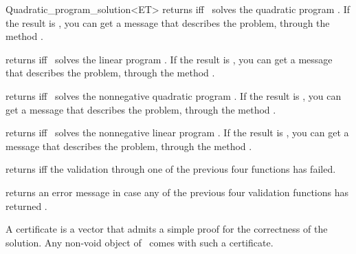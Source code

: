 \begin{ccRefClass}{Quadratic_program_solution<ET>}
{returns  iff \ccVar\ solves the quadratic program . 
If the result is , you can get a message that describes the
problem, through the method .}


{returns  iff \ccVar\ solves the linear program .
If the result is , you can get a message that describes the
problem, through the method . }


{returns  iff \ccVar\ solves the nonnegative 
quadratic program .
If the result is , you can get a message that describes the
problem, through the method . }


{returns  iff \ccVar\ solves the nonnegative
linear program . If the result is , you can get a message that describes the
problem, through the method . }


{returns  iff the validation through one of the 
previous four functions has failed.}

{returns an error message in case any of the
previous four validation functions has returned .}

\begin{ccAdvanced}

A certificate is a vector that admits a simple proof for the 
correctness of the solution. Any non-void object of \ccRefName\ 
comes with such a certificate.


\end{ccAdvanced}
\end{ccRefClass}
